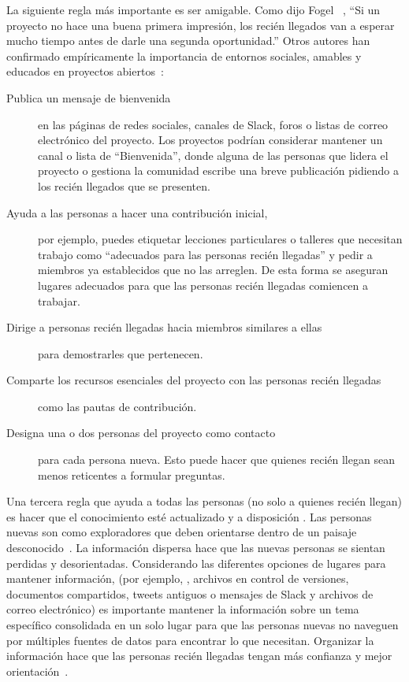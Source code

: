 La siguiente regla más importante es ser amigable.
Como dijo Fogel ~\cite{Foge2005},
``Si un proyecto no hace una buena primera impresión,
los recién llegados van a esperar mucho tiempo antes de darle una segunda oportunidad.''
Otros autores han confirmado empíricamente la importancia de entornos sociales, amables y educados
en proyectos abiertos~\cite{Sing2012,Stei2013,Stei2018}:

\begin{description}

\item[Publica un mensaje de bienvenida]
  en las páginas de redes sociales, canales de Slack, foros o listas de correo electrónico del proyecto.
  Los proyectos podrían considerar mantener un canal o lista de ``Bienvenida'',
  donde alguna de las personas que lidera el proyecto o gestiona la comunidad escribe una breve publicación pidiendo a los recién llegados que se presenten.

\item[Ayuda a las personas a hacer una contribución inicial,]
por ejemplo, puedes etiquetar lecciones particulares o talleres que necesitan trabajo como ``adecuados para las personas recién llegadas''
  y pedir a miembros ya establecidos que no las arreglen. De esta forma se aseguran
  lugares adecuados para que las personas recién llegadas comiencen a trabajar.

\item[Dirige a personas recién llegadas hacia miembros similares a ellas]
  para demostrarles que pertenecen.

\item[Comparte los recursos esenciales del proyecto con las personas recién llegadas]
  como las pautas de contribución.

\item[Designa una o dos personas del proyecto como contacto]
  para cada persona nueva.
  Esto puede hacer que quienes recién llegan sean menos reticentes a formular preguntas.

\end{description}

Una tercera regla que ayuda a todas las personas (no solo a quienes recién llegan)
es hacer que el conocimiento esté actualizado y a disposición .
Las personas nuevas son como exploradores que deben orientarse dentro de un paisaje desconocido~\cite{Dage2010}.
La información dispersa hace que las nuevas personas se sientan perdidas y desorientadas.
Considerando  las diferentes opciones de lugares para mantener información, 
(por ejemplo, \wikis, archivos en control de versiones, documentos compartidos, tweets antiguos o mensajes de Slack y archivos de correo electrónico)
es importante mantener la información sobre un tema específico consolidada en un solo lugar
para que las personas nuevas no naveguen por múltiples fuentes de datos para encontrar lo que necesitan.
Organizar la información hace que las personas recién llegadas tengan más confianza y mejor orientación~\cite{Stei2016}.

